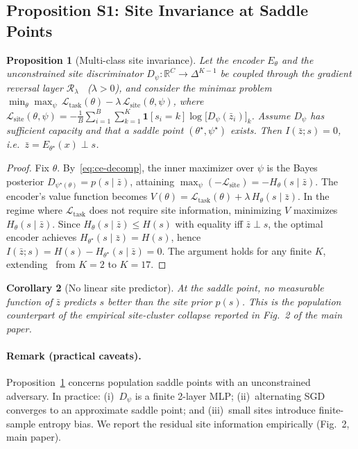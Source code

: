 \documentclass[runningheads]{llncs}
\newcommand{\Lgrl}{\mathcal{L}_{\mathrm{site}}}
\newtheorem{proposition}{Proposition}[section]
\newtheorem{corollary}[proposition]{Corollary}
\begin{document}
\subsection{Proposition S1: Site Invariance at Saddle Points}
\begin{proposition}[Multi-class site invariance]\label{prop:siteinv}
Let the encoder $E_\theta$ and the unconstrained site discriminator $D_\psi:\mathbb{R}^{C}\!\to\!\Delta^{K-1}$ be coupled through the gradient reversal layer $\mathcal{R}_\lambda$~\cite{ganin2016dann} ($\lambda>0$), and consider the minimax problem $\min_{\theta}\max_{\psi}\,\mathcal{L}_{\mathrm{task}}(\theta)-\lambda\,\Lgrl(\theta,\psi)$, where $\Lgrl(\theta,\psi)= -\frac{1}{B}\sum_{i=1}^{B}\sum_{k=1}^{K}\mathbf{1}[s_i{=}k]\log\big[D_\psi(\bar z_i)\big]_k$. Assume $D_\psi$ has sufficient capacity and that a saddle point $(\theta^\star,\psi^\star)$ exists. Then $I(\bar z;s)=0$, i.e.\ $\bar z=E_{\theta^\star}(x)\perp s$.
\end{proposition}
\begin{proof}
Fix $\theta$. By~\eqref{eq:ce-decomp}, the inner maximizer over $\psi$ is the Bayes posterior $D_{\psi^\star(\theta)}=p(s\mid\bar z)$, attaining $\max_{\psi}(-\Lgrl)=-H_\theta(s\mid\bar z)$. The encoder's value function becomes $V(\theta)=\mathcal{L}_{\mathrm{task}}(\theta)+\lambda\,H_\theta(s\mid\bar z)$. In the regime where $\mathcal{L}_{\mathrm{task}}$ does not require site information, minimizing $V$ maximizes $H_\theta(s\mid\bar z)$. Since $H_\theta(s\mid\bar z)\le H(s)$ with equality iff $\bar z\perp s$, the optimal encoder achieves $H_{\theta^\star}(s\mid\bar z)=H(s)$, hence $I(\bar z;s)=H(s)-H_{\theta^\star}(s\mid\bar z)=0$. The argument holds for any finite $K$, extending~\cite{ganin2016dann} from $K{=}2$ to $K{=}17$.
\end{proof}
\begin{corollary}[No linear site predictor]\label{cor:linear}
At the saddle point, no measurable function of $\bar z$ predicts $s$ better than the site prior $p(s)$. This is the population counterpart of the empirical site-cluster collapse reported in Fig.~2 of the main paper.
\end{corollary}
\paragraph{Remark (practical caveats).}
Proposition~\ref{prop:siteinv} concerns population saddle points with an unconstrained adversary. In practice: (i)~$D_\psi$ is a finite 2-layer MLP; (ii)~alternating SGD converges to an approximate saddle point; and (iii)~small sites introduce finite-sample entropy bias. We report the residual site information empirically (Fig.~2, main paper).
\end{document}
